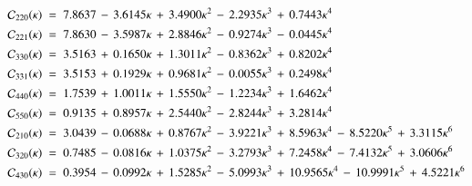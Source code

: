 \begin{align}
	\label{eq:cc_fit_1}
	\mathcal{C}_{220}(\kappa) \; &= \;7.8637\, - \, 3.6145 \kappa\, + \, 3.4900 \kappa ^ 2\, - \, 2.2935 \kappa ^ 3\, + \, 0.7443 \kappa ^ 4 \\ 
	\label{eq:cc_fit_2}
	\mathcal{C}_{221}(\kappa) \; &= \;7.8630\, - \, 3.5987 \kappa\, + \, 2.8846 \kappa ^ 2\, - \, 0.9274 \kappa ^ 3\, - \, 0.0445 \kappa ^ 4 \\ 
	\label{eq:cc_fit_3}
	\mathcal{C}_{330}(\kappa) \; &= \;3.5163\, + \, 0.1650 \kappa\, + \, 1.3011 \kappa ^ 2\, - \, 0.8362 \kappa ^ 3\, + \, 0.8202 \kappa ^ 4 \\ 
	\label{eq:cc_fit_4}
	\mathcal{C}_{331}(\kappa) \; &= \;3.5153\, + \, 0.1929 \kappa\, + \, 0.9681 \kappa ^ 2\, - \, 0.0055 \kappa ^ 3\, + \, 0.2498 \kappa ^ 4 \\ 
	\label{eq:cc_fit_5}
	\mathcal{C}_{440}(\kappa) \; &= \;1.7539\, + \, 1.0011 \kappa\, + \, 1.5550 \kappa ^ 2\, - \, 1.2234 \kappa ^ 3\, + \, 1.6462 \kappa ^ 4 \\ 
	\label{eq:cc_fit_6}
	\mathcal{C}_{550}(\kappa) \; &= \;0.9135\, + \, 0.8957 \kappa\, + \, 2.5440 \kappa ^ 2\, - \, 2.8244 \kappa ^ 3\, + \, 3.2814 \kappa ^ 4 \\ 
	\label{eq:cc_fit_7}
	\mathcal{C}_{210}(\kappa) \; &= \;3.0439\, - \, 0.0688 \kappa\, + \, 0.8767 \kappa ^ 2\, - \, 3.9221 \kappa ^ 3\, + \, 8.5963 \kappa ^ 4\, - \, 8.5220 \kappa ^ 5\, + \, 3.3115 \kappa ^ 6 \\ 
	\label{eq:cc_fit_8}
	\mathcal{C}_{320}(\kappa) \; &= \;0.7485\, - \, 0.0816 \kappa\, + \, 1.0375 \kappa ^ 2\, - \, 3.2793 \kappa ^ 3\, + \, 7.2458 \kappa ^ 4\, - \, 7.4132 \kappa ^ 5\, + \, 3.0606 \kappa ^ 6 \\ 
	\label{eq:cc_fit_9}
	\mathcal{C}_{430}(\kappa) \; &= \;0.3954\, - \, 0.0992 \kappa\, + \, 1.5285 \kappa ^ 2\, - \, 5.0993 \kappa ^ 3\, + \, 10.9565 \kappa ^ 4\, - \, 10.9991 \kappa ^ 5\, + \, 4.5221 \kappa ^ 6
\end{align}
